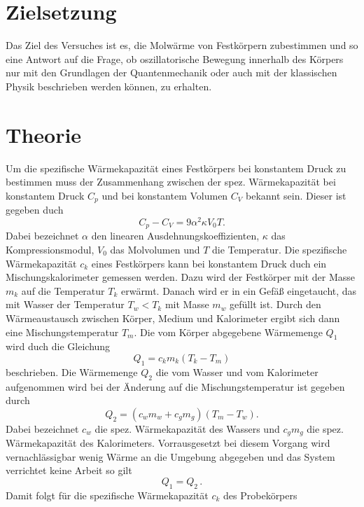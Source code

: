 \section{Zielsetzung}
Das Ziel des Versuches ist es, die Molwärme von Festkörpern zubestimmen und
so eine Antwort auf die Frage, ob oszillatorische Bewegung innerhalb des Körpers
nur mit den Grundlagen der Quantenmechanik oder auch mit der klassischen Physik
beschrieben werden können, zu erhalten.
\section{Theorie}
\label{sec:Theorie}
Um die spezifische Wärmekapazität eines Festkörpers bei konstantem Druck zu
bestimmen muss der Zusammenhang zwischen der spez. Wärmekapazität bei
konstantem Druck $C_p$ und bei konstantem Volumen $C_V$ bekannt sein. Dieser ist
gegeben duch
\begin{equation}
  C_p - C_V = 9 \alpha^2 \kappa V_0 T.
  \label{eqn:cp-cv}
\end{equation}
Dabei bezeichnet $\alpha$ den linearen Ausdehnungskoeffizienten,
$\kappa$ das Kompressionsmodul, $V_0$ das Molvolumen und $T$ die Temperatur.
Die spezifische Wärmekapazität $c_k $ eines Festkörpers kann bei konstantem
Druck duch ein Mischungskalorimeter gemessen werden. Dazu wird der Festkörper
mit der Masse $m_k$ auf die Temperatur $T_k$ erwärmt. Danach wird er in ein Gefäß
eingetaucht, das mit Wasser der Temperatur $ T_w < T_k $ mit Masse $m_w$ gefüllt
ist. Durch den Wärmeaustausch zwischen Körper, Medium und Kalorimeter ergibt sich dann
eine Mischungstemperatur $T_m$.  Die vom Körper abgegebene Wärmemenge $Q_1$
wird duch die Gleichung
\begin{equation}
  Q_1 = c_k m_k (T_k - T_m)
  \label{eqn:q1}
\end{equation}
beschrieben. Die Wärmemenge $Q_2$ die vom Wasser und vom Kalorimeter aufgenommen wird
bei der Änderung auf die Mischungstemperatur ist gegeben durch
\begin{equation}
  Q_2 = (c_w m_w + c_g m_g)(T_m - T_w).
  \label{eqn:q2}
\end{equation}
Dabei bezeichnet $c_w$ die spez. Wärmekapazität des Wassers und
$c_gm_g$ die spez. Wärmekapazität des Kalorimeters.
Vorrausgesetzt bei diesem Vorgang wird vernachlässigbar wenig Wärme an die
Umgebung abgegeben und das System verrichtet keine Arbeit so gilt
\begin{equation*}
  Q_1 = Q_2 \, .
\end{equation*}
Damit folgt für die spezifische Wärmekapazität $c_k$ des Probekörpers
